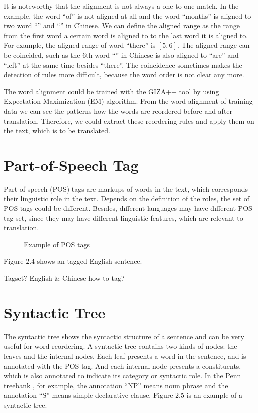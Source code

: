 \label{alignedrange}
It is noteworthy that the alignment is not always a one-to-one match. In the example, the word ``of'' is not aligned at all and the word ``months'' is aligned to two word ``'' and ``'' in Chinese. We can define the aligned range as the range from the first word a certain word is aligned to to the last word it is aligned to. For example, the aligned range of word ``there'' is $[5,6]$. The aligned range can be coincided, such as the $6$th word ``'' in Chinese is also aligned to ``are'' and ``left'' at the same time besides ``there''. The coincidence sometimes makes the detection of rules more difficult, because the word order is not clear any more.

The word alignment could be trained with the GIZA++ tool by using Expectation Maximization (EM) algorithm. From the word alignment of training data we can see the patterns how the words are reordered before and after translation. Therefore, we could extract these reordering rules and apply them on the text, which is to be translated.

\section{Part-of-Speech Tag}

Part-of-speech (POS) tags are markups of words in the text, which corresponds their linguistic role in the text. Depends on the definition of the roles, the set of POS tags could be different. Besides, different languages may have different POS tag set, since they may have different linguistic features, which are relevant to translation.
\begin{figure}[H]
\centering

\caption{Example of POS tags}
\end{figure}
Figure $2.4$ shows an tagged English sentence. 

Tagset? English \& Chinese how to tag?


\label{ch:Foundations:sec:PosTag}

\section{Syntactic Tree}
\label{ch:Foundations:sec:SyntacticTree}

The syntactic tree shows the syntactic structure of a sentence and can be very useful for word reordering. A syntactic tree contains two kinds of nodes: the leaves and the internal nodes. Each leaf presents a word in the sentence, and is annotated with the POS tag. And each internal node presents a constituents, which is also annotated to indicate its category or syntactic role. In the Penn treebank \citep{penn}, for example, the annotation ``NP'' means noun phrase and the annotation ``S'' means simple declarative clause. Figure $2.5$ is an example of a syntactic tree.

